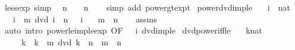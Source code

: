\begin{isabellebody}
\endisatagproof
{\isafoldproof}%
%
\isadelimproof
\isanewline
%
\endisadelimproof
\isanewline
{}\isamarkupfalse%
\ less{\isacharunderscore}{\kern0pt}exp\ {\isacharbrackleft}{\kern0pt}simp{\isacharbrackright}{\kern0pt}{\isacharcolon}{\kern0pt}\isanewline
\ \ {\isacartoucheopen}n\ {\isacharless}{\kern0pt}\ {}\ {\isacharcircum}{\kern0pt}\ n{\isacartoucheclose}\isanewline
%
\isadelimproof
\ \ %
\endisadelimproof
%
\isatagproof
{}\isamarkupfalse%
\ {\isacharparenleft}{\kern0pt}simp\ add{\isacharcolon}{\kern0pt}\ power{\isacharunderscore}{\kern0pt}gt{\isacharunderscore}{\kern0pt}expt{\isacharparenright}{\kern0pt}%
\endisatagproof
{\isafoldproof}%
%
\isadelimproof
\isanewline
%
\endisadelimproof
\isanewline
{}\isamarkupfalse%
\ power{\isacharunderscore}{\kern0pt}dvd{\isacharunderscore}{\kern0pt}imp{\isacharunderscore}{\kern0pt}le{\isacharcolon}{\kern0pt}\isanewline
\ \ \ i\ {\isacharcolon}{\kern0pt}{\isacharcolon}{\kern0pt}\ nat\isanewline
\ \ \ {\isachardoublequoteopen}i\ {\isacharcircum}{\kern0pt}\ m\ dvd\ i\ {\isacharcircum}{\kern0pt}\ n{\isachardoublequoteclose}\ {\isachardoublequoteopen}{}\ {\isacharless}{\kern0pt}\ i{\isachardoublequoteclose}\isanewline
\ \ \ {\isachardoublequoteopen}m\ {\isasymle}\ n{\isachardoublequoteclose}\isanewline
%
\isadelimproof
\ \ %
\endisadelimproof
%
\isatagproof
{}\isamarkupfalse%
\ assms\ \isamarkupfalse%
\ {\isacharparenleft}{\kern0pt}auto\ intro{\isacharcolon}{\kern0pt}\ power{\isacharunderscore}{\kern0pt}le{\isacharunderscore}{\kern0pt}imp{\isacharunderscore}{\kern0pt}le{\isacharunderscore}{\kern0pt}exp\ {\isacharbrackleft}{\kern0pt}OF\ {\isacartoucheopen}{}\ {\isacharless}{\kern0pt}\ i{\isacartoucheclose}\ dvd{\isacharunderscore}{\kern0pt}imp{\isacharunderscore}{\kern0pt}le{\isacharbrackright}{\kern0pt}{\isacharparenright}{\kern0pt}%
\endisatagproof
{\isafoldproof}%
%
\isadelimproof
\isanewline
%
\endisadelimproof
\isanewline
{}\isamarkupfalse%
\ dvd{\isacharunderscore}{\kern0pt}power{\isacharunderscore}{\kern0pt}iff{\isacharunderscore}{\kern0pt}le{\isacharcolon}{\kern0pt}\isanewline
\ \ \ k{\isacharcolon}{\kern0pt}{\isacharcolon}{\kern0pt}nat\isanewline
\ \ \ {\isachardoublequoteopen}{}\ {\isasymle}\ k\ {\isasymLongrightarrow}\ {\isacharparenleft}{\kern0pt}{\isacharparenleft}{\kern0pt}k\ {\isacharcircum}{\kern0pt}\ m{\isacharparenright}{\kern0pt}\ dvd\ {\isacharparenleft}{\kern0pt}k\ {\isacharcircum}{\kern0pt}\ n{\isacharparenright}{\kern0pt}\ {\isasymlongleftrightarrow}\ m\ {\isasymle}\ n{\isacharparenright}{\kern0pt}{\isachardoublequoteclose}\isanewline

\end{isabellebody}
